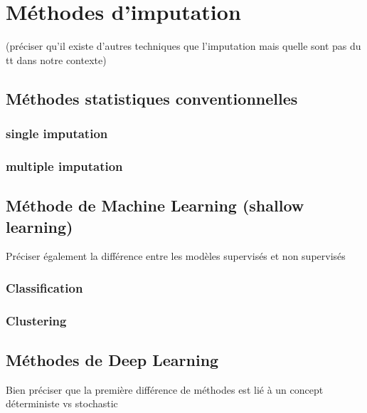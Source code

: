 \section{Méthodes d’imputation}
(préciser qu'il existe d'autres techniques que l'imputation mais quelle sont pas du tt dans notre contexte)



\subsection{Méthodes statistiques conventionnelles}

\subsubsection{single imputation}

\subsubsection{multiple imputation}

\subsection{Méthode de Machine Learning (shallow learning)}

Préciser également la différence entre les modèles supervisés et non supervisés
\subsubsection{Classification}

\subsubsection{Clustering}



\subsection{Méthodes de Deep Learning}

Bien préciser que la première différence de méthodes est lié à un concept déterministe vs stochastic
